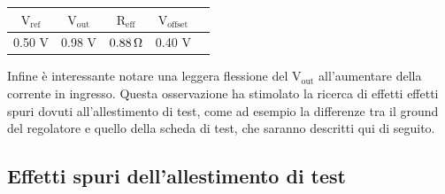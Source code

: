 \begin{center}
\begin{tabular}{ccccc}
\hline
$\mathrm{V_{ref}}$ & $\mathrm{V_{out}}$ & $\mathrm{R_{eff}}$ & $\mathrm{V_{offset}}$ \\
\hline
0.50 V & 0.98 V & $0.88{\rm \, \Omega}$ & 0.40 V\\
\hline
\end{tabular}
\end{center}
Infine è interessante notare una leggera flessione del $\mathrm{V_{out}}$ all'aumentare della corrente in ingresso.
Questa osservazione ha stimolato la ricerca di effetti effetti spuri dovuti all'allestimento di test, come ad esempio la differenze tra il ground del regolatore e quello della scheda di test, che saranno descritti qui di seguito.

\subsection{Effetti spuri dell'allestimento di test}
\label{EffettiSpuri}

